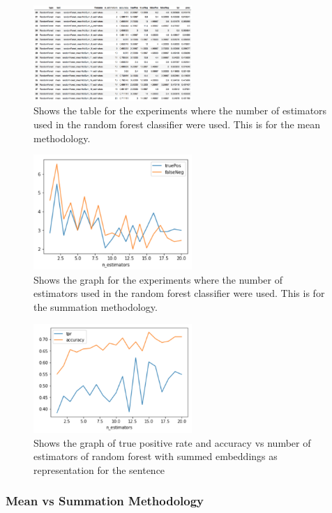 \documentclass[twoside,twocolumn]{article}
\begin{document}
\begin{figure}[H]
\includegraphics[width=6cm]{randForest_estimators_meaned_table}
\centering
\caption{Shows the table for the experiments where the number of estimators used
in the random forest classifier were used. This is for the mean methodology.}
\end{figure}

\begin{figure}[H]
\includegraphics[width=6cm]{randForest_estimators_meaned_graph}
\centering
\caption{Shows the graph for the experiments where the number of estimators used
in the random forest classifier were used. This is for the summation methodology.}
\end{figure}

\begin{figure}[H]
\includegraphics[width=6cm]{randForest_estimators_meaned_graph-tpr}
\centering
\caption{Shows the graph of true positive rate and accuracy vs number of estimators of random forest 
with summed embeddings as representation for the sentence}
\end{figure}


\subsubsection{Mean vs Summation Methodology}
\end{document}
